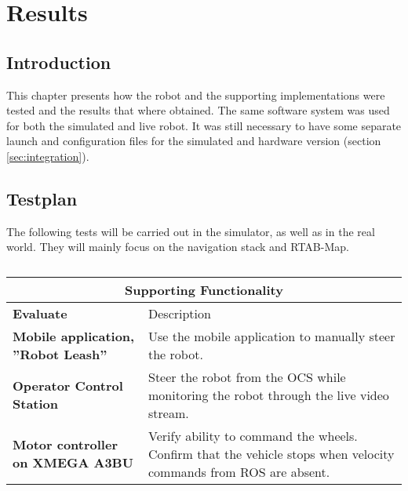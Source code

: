 \chapter{Results}
\label{chp:results} 

\section{Introduction}

This chapter presents how the robot and the supporting implementations were tested and the results that where obtained. The same software system was used for both the simulated and live robot. It was still necessary to have some separate launch and configuration files for the simulated and hardware version (section \ref{sec:integration}). 



\section{Testplan}

The following tests will be carried out in the simulator, as well as in the real world. They will mainly focus on the navigation stack and \ac{RTAB-Map}. 

\begin{table}
	\centering
	\begin{tabular}{ p{3.5cm} | p{7cm} }
		\multicolumn{2}{c}{Supporting Functionality}\\
		\hline
		\textbf{Evaluate} & Description\\
		\hline
		\textbf{Mobile application, ''Robot Leash''} & Use the mobile application to manually steer the robot.\\
		\hline
		\textbf{Operator Control Station} & Steer the robot from the \ac{OCS} while monitoring the robot through the live video stream. \\
		\hline
		\textbf{Motor controller on XMEGA A3BU} & Verify ability to command the wheels. Confirm that the vehicle stops when velocity commands from \ac{ROS} are absent.\\
		\hline
	\end{tabular}
	\caption{}
\end{table}

